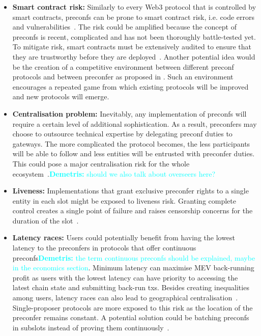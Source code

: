 \documentclass[a4paper]{article}
\theoremstyle{boldstyle}
\newcommand{\dk}[1]{\textcolor{cyan}{\textbf{Demetris:} #1}}
\begin{document}
    \begin{itemize}
        \item \textbf{Smart contract risk:} Similarly to every Web3 protocol that is controlled by smart contracts, preconfs can be prone to smart contract risk, i.e. code errors and vulnerabilities~\cite{W:SmartContractVulnerabilitiesandMitigationStrategies}. The risk could be amplified because the concept of preconfs is recent, complicated and has not been thoroughly battle-tested yet. To mitigate risk, smart contracts must be extensively audited to ensure that they are trustworthy before they are deployed~\cite{W:CrediblyNeutralPreconfirmationCollateral:ThePreconfirmationRegistry}. Another potential idea would be the creation of a competitive environment between different preconf protocols and between preconfer as proposed in \cite{W:ThePreconfirmationSauna}. Such an environment encourages a repeated game from which existing protocols will be improved and new protocols will emerge.
        
        \item \textbf{Centralisation problem:} Inevitably, any implementation of preconfs will require a certain level of additional sophistication. As a result, preconfers may choose to outsource technical expertise by delegating preconf duties to gateways. The more complicated the protocol becomes, the less participants will be able to follow and less entities will be entrusted with preconfer duties. This could pose a major centralisation risk for the whole ecosystem~\cite{W:DelegationinBolt:OutsourcingSophisticationWhilePreservingDecentralization,W:BecomingBased:APathtowardsDecentralisedSequencing}.\dk{should we also talk about overseers here?}
    
        \item \textbf{Liveness:}
        Implementations that grant exclusive preconfer rights to a single entity in each slot might be exposed to liveness risk. Granting complete control creates a single point of failure and raises censorship concerns for the duration of the slot~\cite{W:StrawmanningBasedPreconfirmations,W:BasedPreconfirmationswithMulti-roundMEV-Boost}. 
        
        \item \textbf{Latency races:} 
        Users could potentially benefit from having the lowest latency to the preconfers in protocols that offer continuous preconfs\dk{the term continuous preconfs should be explained, maybe in the economics section}. Minimum latency can maximise MEV back-running profit as users with the lowest latency can have priority to accessing the latest chain state and submitting back-run txs. Besides creating inequalities among users, latency races can also lead to geographical centralisation~\cite{W:StrawmanningBasedPreconfirmations}. 
        Single-proposer protocols are more exposed to this risk as the location of the preconfer remains constant. A potential solution could be batching preconfs in subslots instead of proving them continuously~\cite{W:BasedPreconfirmationswithMulti-roundMEV-Boost}.
                

\end{itemize}
\end{document}
